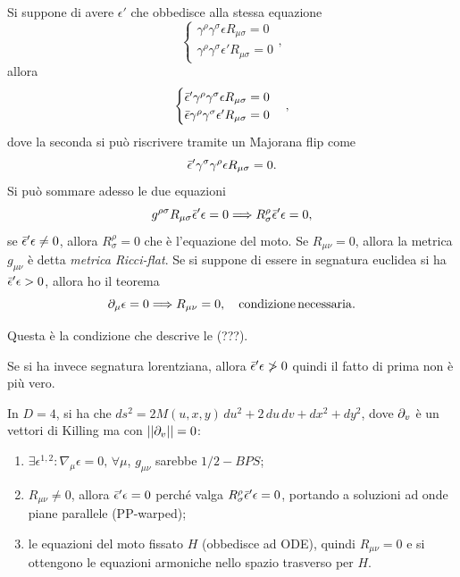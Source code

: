 Si suppone di avere $\epsilon'$ che obbedisce alla stessa equazione 
\begin{equation}
    \begin{cases}
        \gamma^\rho \gamma^\sigma \epsilon R_{\mu\sigma} = 0 \\
        \gamma^\rho \gamma^\sigma \epsilon' R_{\mu\sigma} = 0
    \end{cases},
\end{equation}
allora 
\begin{equation}
    \begin{cases}
        \bar{\epsilon}'\gamma^\rho \gamma^\sigma \epsilon R_{\mu\sigma} = 0 \\
        \bar{\epsilon}\gamma^\rho \gamma^\sigma \epsilon' R_{\mu\sigma} = 0
    \end{cases},
\end{equation}
dove la seconda si può riscrivere tramite un Majorana flip come 
\begin{equation}
    \bar{\epsilon}'\gamma^\sigma\gamma^\rho \epsilon R_{\mu\sigma} = 0.
\end{equation}
Si può sommare adesso le due equazioni 
\begin{equation}
    g^{\rho\sigma}R_{\mu\sigma}\bar{\epsilon}'\epsilon = 0 \Longrightarrow R^\rho_\sigma \bar{\epsilon}'\epsilon = 0,
\end{equation}
se $\bar{\epsilon}'\epsilon \neq 0$, allora $R^\rho_\sigma = 0$ che è l'equazione del moto. Se $R_{\mu\nu} = 0$, allora la metrica $g_{\mu\nu}$ è detta \emph{metrica Ricci-flat}. Se si suppone di essere in segnatura euclidea si ha $\bar{\epsilon}'\epsilon > 0$, allora ho il teorema 
\begin{equation}
    \partial_\mu \epsilon = 0 \Longrightarrow R_{\mu\nu} = 0,\quad \mathrm{condizione\,necessaria}.
\end{equation}
\begin{obs}
    Questa è la condizione che descrive le (???).
\end{obs}
Se si ha invece segnatura lorentziana, allora $\bar{\epsilon}'\epsilon \ngtr 0$ quindi il fatto di prima non è più vero.
\begin{ex}
    In $D = 4$, si ha che $ds^2 = 2M(u,x,y)\,du^2 + 2\,du\,dv + dx^2 + dy^2$, dove $\partial_v$ è un vettori di Killing ma con $||\partial_v|| = 0$:
    \begin{enumerate}
        \item $\exists \epsilon^{1,2} : \nabla_\mu\epsilon = 0,\, \forall \mu$, $g_{\mu\nu}$ sarebbe $1/2- BPS$;
        \item $R_{\mu\nu} \neq 0$, allora $\bar{\epsilon}'\epsilon = 0$ perché valga $R^\rho_\sigma \bar{\epsilon}'\epsilon = 0$, portando a soluzioni ad onde piane parallele (PP-warped);
        \item le equazioni del moto fissato $H$ (obbedisce ad ODE), quindi $R_{\mu\nu} = 0$ e si ottengono le equazioni armoniche nello spazio trasverso per $H$.
    \end{enumerate}
\end{ex}

